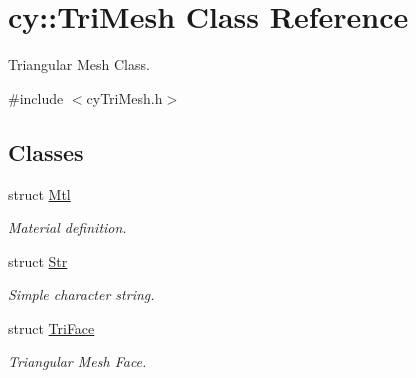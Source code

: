 \hypertarget{classcy_1_1_tri_mesh}{}\section{cy\+::Tri\+Mesh Class Reference}
\label{classcy_1_1_tri_mesh}


Triangular Mesh Class.  




{\ttfamily \#include $<$cy\+Tri\+Mesh.\+h$>$}

\subsection*{Classes}
\begin{DoxyCompactItemize}
\item 
struct \mbox{\hyperlink{structcy_1_1_tri_mesh_1_1_mtl}{Mtl}}
\begin{DoxyCompactList}\small\item\em Material definition. \end{DoxyCompactList}\item 
struct \mbox{\hyperlink{structcy_1_1_tri_mesh_1_1_str}{Str}}
\begin{DoxyCompactList}\small\item\em Simple character string. \end{DoxyCompactList}\item 
struct \mbox{\hyperlink{structcy_1_1_tri_mesh_1_1_tri_face}{Tri\+Face}}
\begin{DoxyCompactList}\small\item\em Triangular Mesh Face. \end{DoxyCompactList}\end{DoxyCompactItemize}
